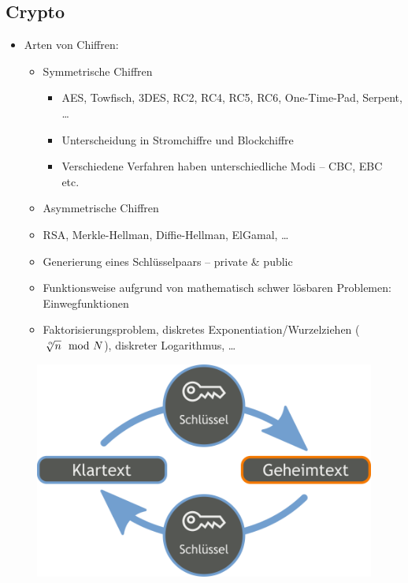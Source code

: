\documentclass[xcolor=dvipsnames, aspectratio=169]{beamer}
\begin{document}
\subsection{Crypto}
\begin{frame}{}
\begin{itemize}
	\item Arten von Chiffren:
	\begin{itemize}
		\item Symmetrische Chiffren
		\begin{itemize}
			\item AES, Towfisch, 3DES, RC2, RC4, RC5, RC6, One-Time-Pad, Serpent, \dots
			\item Unterscheidung in Stromchiffre und Blockchiffre
			\item Verschiedene Verfahren haben unterschiedliche Modi -- CBC, EBC etc.
		\end{itemize}
		\item Asymmetrische Chiffren
			\item RSA, Merkle-Hellman, Diffie-Hellman, ElGamal, \dots
			\item Generierung eines Schlüsselpaars -- private \& public
			\item Funktionsweise aufgrund von mathematisch schwer lösbaren Problemen: Einwegfunktionen
			\item Faktorisierungsproblem, diskretes Exponentiation/Wurzelziehen ($ \sqrt[\leftroot{-2}\uproot{2}\alpha]{n} \mod N$), diskreter Logarithmus, \dots
	\end{itemize}
\end{itemize}
\end{frame}

\begin{frame}
	\begin{figure}
	\center
	\includegraphics[scale=0.2]{symmetric_cryptography}
	\end{figure}
\end{frame}
\end{document}
